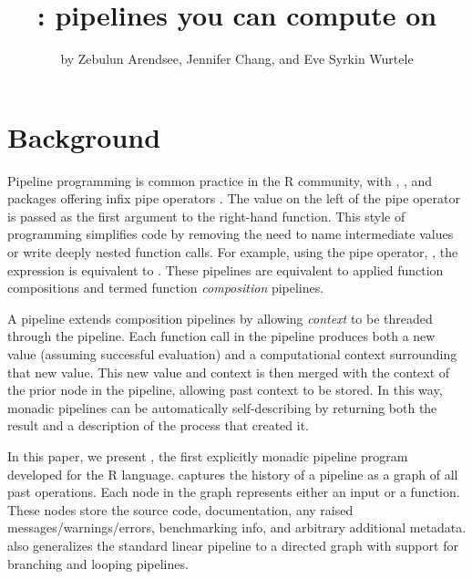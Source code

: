 \title{: pipelines you can compute on}
\author{by Zebulun Arendsee, Jennifer Chang, and Eve Syrkin Wurtele}
\maketitle



\section{Background}

Pipeline programming is common practice in the R community, with
, , and  packages offering
infix pipe operators \citep{magrittr2014, pipeR2016, mount2018dot}. The value
on the left of the pipe operator is passed as the first argument to the
right-hand function. This style of programming simplifies code by removing the
need to name intermediate values or write deeply nested function calls. For
example, using the  pipe operator, \code{\%>\%}, the
expression  is equivalent to . These
pipelines are equivalent to applied function compositions and termed
function \emph{composition} pipelines.

A  \citep{wadler1990comprehending} pipeline extends composition
pipelines by allowing \emph{context} to be threaded through the pipeline. Each
function call in the pipeline produces both a new value (assuming successful
evaluation) and a computational context surrounding that new value. This new
value and context is then merged with the context of the prior node in the
pipeline, allowing past context to be stored. In this way, monadic pipelines
can be automatically self-describing by returning both the result and a
description of the process that created it.

In this paper, we present , the first explicitly monadic
pipeline program developed for the R language.  captures the
history of a pipeline as a graph of all past operations. Each node in the graph
represents either an input or a function. These nodes store the source code,
documentation, any raised messages/warnings/errors, benchmarking info, and
arbitrary additional metadata.  also generalizes the standard
linear pipeline to a directed graph with support for branching and looping
pipelines.

